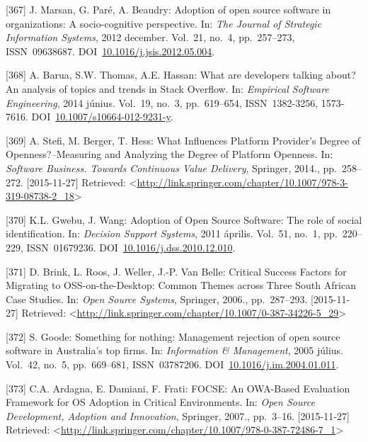 \documentclass[12pt,magyar,a4paper,oneside]{scrreprt}
\newenvironment{cslreferences}%
  {}%
  {\par}
\begin{document}
\begin{cslreferences}
\leavevmode\hypertarget{ref-marsan_adoption_2012}{}%
{[}367{]} J. Marsan, G. Paré, A. Beaudry: Adoption of open source
software in organizations: A socio-cognitive perspective. In: \emph{The
Journal of Strategic Information Systems}, 2012 december. Vol.~21,
no.~4, pp.~257--273, ISSN~09638687.
DOI~\href{https://doi.org/10.1016/j.jsis.2012.05.004}{10.1016/j.jsis.2012.05.004}.

\leavevmode\hypertarget{ref-barua_what_2014}{}%
{[}368{]} A. Barua, S.W. Thomas, A.E. Hassan: What are developers
talking about? An analysis of topics and trends in Stack Overflow. In:
\emph{Empirical Software Engineering}, 2014 június. Vol.~19, no.~3,
pp.~619--654, ISSN~1382-3256, 1573-7616.
DOI~\href{https://doi.org/10.1007/s10664-012-9231-y}{10.1007/s10664-012-9231-y}.

\leavevmode\hypertarget{ref-stefi_what_2014}{}%
{[}369{]} A. Stefi, M. Berger, T. Hess: What Influences Platform
Provider's Degree of Openness?--Measuring and Analyzing the Degree of
Platform Openness. In: \emph{Software Business. Towards Continuous Value
Delivery}, Springer, 2014., pp.~258--272. {[}2015-11-27{]} Retrieved:
\textless{}\url{http://link.springer.com/chapter/10.1007/978-3-319-08738-2_18}\textgreater{}

\leavevmode\hypertarget{ref-gwebu_adoption_2011}{}%
{[}370{]} K.L. Gwebu, J. Wang: Adoption of Open Source Software: The
role of social identification. In: \emph{Decision Support Systems}, 2011
április. Vol.~51, no.~1, pp.~220--229, ISSN~01679236.
DOI~\href{https://doi.org/10.1016/j.dss.2010.12.010}{10.1016/j.dss.2010.12.010}.

\leavevmode\hypertarget{ref-brink_critical_2006}{}%
{[}371{]} D. Brink, L. Roos, J. Weller, J.-P. Van Belle: Critical
Success Factors for Migrating to OSS-on-the-Desktop: Common Themes
across Three South African Case Studies. In: \emph{Open Source Systems},
Springer, 2006., pp.~287--293. {[}2015-11-27{]} Retrieved:
\textless{}\url{http://link.springer.com/chapter/10.1007/0-387-34226-5_29}\textgreater{}

\leavevmode\hypertarget{ref-goode_something_2005}{}%
{[}372{]} S. Goode: Something for nothing: Management rejection of open
source software in Australia's top firms. In: \emph{Information \&
Management}, 2005 július. Vol.~42, no.~5, pp.~669--681, ISSN~03787206.
DOI~\href{https://doi.org/10.1016/j.im.2004.01.011}{10.1016/j.im.2004.01.011}.

\leavevmode\hypertarget{ref-ardagna_focse_2007}{}%
{[}373{]} C.A. Ardagna, E. Damiani, F. Frati: FOCSE: An OWA-Based
Evaluation Framework for OS Adoption in Critical Environments. In:
\emph{Open Source Development, Adoption and Innovation}, Springer,
2007., pp.~3--16. {[}2015-11-27{]} Retrieved:
\textless{}\url{http://link.springer.com/chapter/10.1007/978-0-387-72486-7_1}\textgreater{}


\end{cslreferences}
\end{document}
